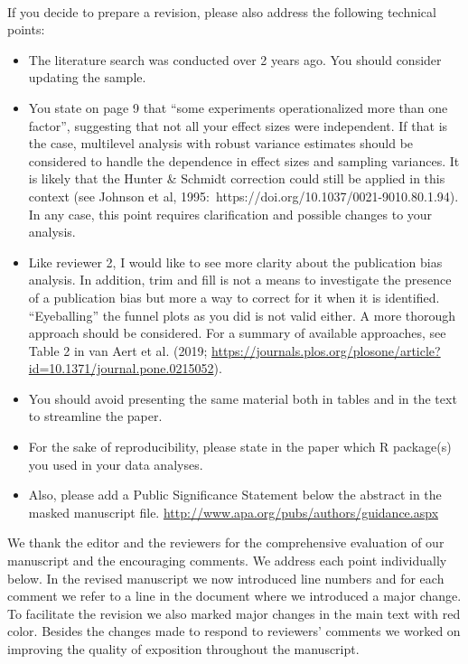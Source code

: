 \documentclass[english,natbib,man,floatsintext]{apa6}
\begin{document}
{\\
If you decide to prepare a revision, please also address the following technical points: 
\begin{itemize}
    \item The literature search was conducted over 2 years ago. You should consider updating the sample.
    \item You state on page 9 that “some experiments operationalized more than one factor”, suggesting that not all your effect sizes were independent. If that is the case, multilevel analysis with robust variance estimates should be considered to handle the dependence in effect sizes and sampling variances. It is likely that the Hunter \& Schmidt correction could still be applied in this context (see Johnson et al, 1995: https://doi.org/10.1037/0021-9010.80.1.94). In any case, this point requires clarification and possible changes to your analysis.
    \item Like reviewer 2, I would like to see more clarity about the publication bias analysis. In addition, trim and fill is not a means to investigate the presence of a publication bias but more a way to correct for it when it is identified. “Eyeballing” the funnel plots as you did is not valid either. A more thorough approach should be considered. For a summary of available approaches, see Table 2 in van Aert et al. (2019; \url{https://journals.plos.org/plosone/article?id=10.1371/journal.pone.0215052}).
    \item You should avoid presenting the same material both in tables and in the text to streamline the paper.
    \item For the sake of reproducibility, please state in the paper which R package(s) you used in your data analyses.
    \item Also, please add a Public Significance Statement below the abstract in the masked manuscript file. \url{http://www.apa.org/pubs/authors/guidance.aspx}
\end{itemize}
}

We thank the editor and the reviewers for the comprehensive evaluation of our manuscript and the encouraging comments. We address each point individually below. In the revised manuscript we now introduced line numbers and for each comment we refer to a line in the document where we introduced a major change. To facilitate the revision we also marked major changes in the main text with red color. Besides the changes made to respond to reviewers' comments we worked on improving the quality of exposition throughout the manuscript.
\end{document}
